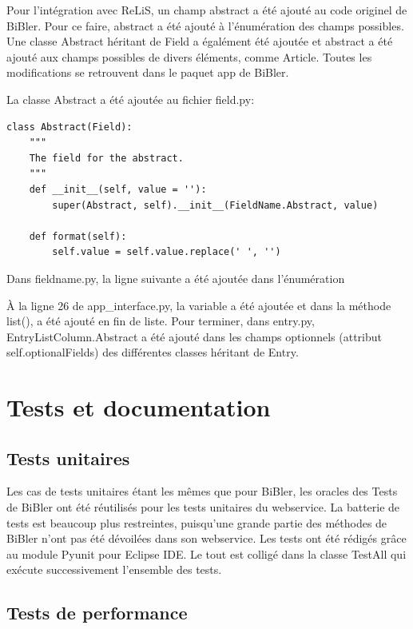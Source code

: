 \documentclass[12pt,titlepage]{article}
\let\oldsection\section
\renewcommand\section{\clearpage\oldsection}
\begin{document}
Pour l'intégration avec ReLiS, un champ abstract a été ajouté au code originel de BiBler. Pour ce faire, abstract a été ajouté à l'énumération des champs possibles. Une classe Abstract héritant de Field a égalément été ajoutée et abstract a été ajouté aux champs possibles de divers éléments, comme Article. Toutes les modifications se retrouvent dans le paquet app de BiBler. \newline

La classe Abstract a été ajoutée au fichier field.py:
\begin{lstlisting}[style=py]
class Abstract(Field):
    """
    The field for the abstract.
    """
    def __init__(self, value = ''):
        super(Abstract, self).__init__(FieldName.Abstract, value)
        
    def format(self):
        self.value = self.value.replace(' ', '')

\end{lstlisting}

Dans fieldname.py, la ligne suivante a été ajoutée dans l'énumération

À la ligne 26 de app\_interface.py, la variable  a été ajoutée et dans la méthode list(),  a été ajouté en fin de liste. Pour terminer, dans entry.py, EntryListColumn.Abstract a été ajouté dans les champs optionnels (attribut self.optionalFields) des différentes classes héritant de Entry.

\section{Tests et documentation}
\subsection{Tests unitaires}
Les cas de tests unitaires étant les mêmes que pour BiBler, les oracles des Tests de BiBler ont été réutilisés pour les tests unitaires du webservice. La batterie de tests est beaucoup plus restreintes, puisqu'une grande partie des méthodes de BiBler n'ont pas été dévoilées dans son webservice. Les tests ont été rédigés grâce au module Pyunit pour Eclipse IDE. Le tout est colligé dans la classe TestAll qui exécute successivement l'ensemble des tests. \newline
\subsection{Tests de performance}
\end{document}
